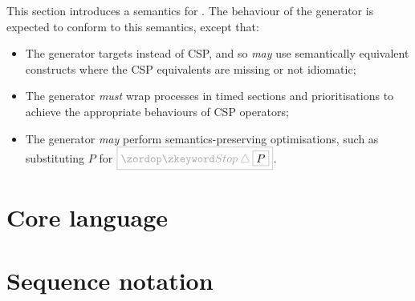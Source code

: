 
This section introduces a \tockcsp{} semantics for \langname.
The behaviour of the \langname{} generator is expected to conform to
this semantics, except that:

\begin{itemize}
\item
  The generator targets \cspm{} instead of CSP, and so \emph{may}
  use semantically equivalent \cspm{} constructs where the CSP equivalents
  are missing or not idiomatic;
\item
  The generator \emph{must} wrap processes in
  timed sections and prioritisations to achieve the appropriate \tockcsp{} behaviours of
  CSP operators;
\item
  The generator \emph{may} perform semantics-preserving optimisations,
  such as substituting \(P\) for \(\tlang{\Stop \interrupt \olang{P}}\).
\end{itemize}


\section{Core language}\label{sec:semantics-tockcsp-core}

\section{Sequence notation}\label{sec:semantics-tockcsp-seq}


